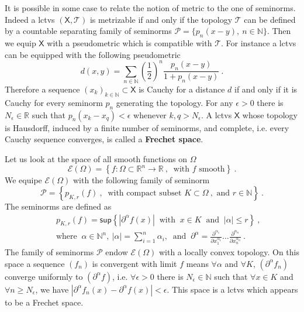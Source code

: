 \documentclass[10pt]{book}
\newcommand{\abs}[1]{\left|#1\right|}
\renewcommand{\sup}{\mathsf{sup}}
\newcommand{\Ecal}{\mathcal{E}}
\newcommand{\Pcal}{\mathcal{P}}
\newcommand{\Tcal}{\mathcal{T}}
\newcommand{\Nbb}{\mathbb{N}}
\newcommand{\Rbb}{\mathbb{R}}
\newcommand{\Xsf}{\mathsf{X}}
\theoremstyle{break}
\begin{document}
It is possible in some case to relate the notion of metric to the one of seminorms. Indeed a lctvs $(\Xsf,\Tcal)$ is metrizable if and only if the topology $\Tcal$ can be defined by a countable separating family of seminorms $\Pcal=\{p_n(x-y), \ n\in\Nbb\}$. Then we equip $\Xsf$ with a pseudometric which is compatible with $\Tcal$. For instance a lctvs can be equipped with the following pseudometric
%
\begin{equation*}
d(x,y) = \sum_{n\in\Nbb} \left(\frac12\right)^n \frac{p_n(x-y)}{1+p_n(x-y)} \ .
\end{equation*}
%
Therefore a sequence $(x_k)_{k\in\Nbb} \subset \Xsf$ is Cauchy for a distance $d$ if and only if it is Cauchy for every seminorm $p_n$ generating the topology. For any $\epsilon > 0$ there is $N_\epsilon \in \Rbb$ such that $p_n(x_k - x_q) < \epsilon$ whenever $k, q > N_\epsilon$. A lctvs $\Xsf$ whose topology is Hausdorff, induced by a finite number of seminorms, and complete, i.e. every Cauchy sequence converges, is called a \textbf{Frechet space}. 


\bigskip


Let us look at the space of all smooth functions on $\Omega$
%
\begin{equation*}
\Ecal(\Omega) =  \left\{ f : \Omega \subset \Rbb^n \to \Rbb \ , \ \mbox{ with } f \mbox{ smooth}  \right\} \ .
\end{equation*}
%
We equipe $\Ecal(\Omega)$ with the following family of seminorm
%
\begin{equation*}
\Pcal = \left\{ p_{K,r}(f) \ , \ \mbox{ with compact subset } K \subset \Omega \ , \mbox{ and } r \in \Nbb \right\} \ . 
\end{equation*}
%
The seminorms are defined as
%
\begin{eqnarray*}
&& p_{K,r}(f) = \sup \left\{ \abs{\partial^\alpha f(x)} \ \mbox{ with } \ x\in K \ \mbox{ and } \ \abs{\alpha} \leq r  \right\} \ , \\
&& \mbox{where } \ \alpha \in \Nbb^n, \ \abs{\alpha} = \sum_{i=1}^n \alpha_i, \ \mbox{ and } \ \partial^\alpha = \frac{\partial^{\alpha_1}}{\partial x_1^{\alpha_1}} \dots \frac{\partial^{\alpha_n}}{\partial x_n^{\alpha_n}} \ .
\end{eqnarray*}
%
The family of seminorms $\Pcal$ endow $\Ecal(\Omega)$ with a locally convex topology.  On this space a sequence $(f_n)$ is convergent with limit $f$ means $\forall \alpha$ and $\forall K$, $(\partial^\alpha f_n)$ converge uniformly to $(\partial^\alpha f)$, i.e. $\forall \epsilon > 0$ there is $N_\epsilon \in \Nbb$ such that $\forall x \in K$ and $\forall n \geq N_\epsilon$, we have $\abs{\partial^\alpha f_n(x) - \partial^\alpha f(x)} < \epsilon$. This space is a lctvs which appears to be a Frechet space.
\end{document}
